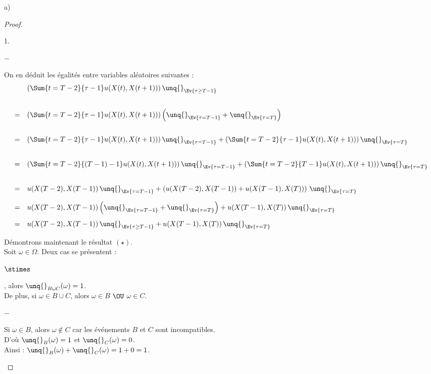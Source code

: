 \documentclass[11pt]{article}%
\begin{document}
\begin{noliste}{a)}
\begin{proof}
\begin{remarkL}{1.}
\begin{noliste}{$-$}
	  \item On en déduit les égalités entre variables aléatoires
	  suivantes :
	  \[
	    \begin{array}{cl}
	      & \left(\Sum{t=T-2}{\tau -1} u(X(t),X(t+1))\right)
	      \unq{}_{\Ev{\tau \geq T-1}}
	      \\[.8cm]
	      =& 
	      \left(\Sum{t=T-2}{\tau -1} u(X(t),X(t+1))\right)
	      \left(\unq{}_{\Ev{\tau = T-1}} + \unq{}_{\Ev{\tau =T}}
	      \right)
	      \\[.8cm]
	      =& 
	      \left(\Sum{t=T-2}{\tau -1} u(X(t),X(t+1))\right)
	      \unq{}_{\Ev{\tau = T-1}} +
	      \left(\Sum{t=T-2}{\tau -1} u(X(t),X(t+1))\right)
	      \unq{}_{\Ev{\tau = T}}
	      \\[.8cm]
	      =& 
	      \left(\Sum{t=T-2}{(T-1) -1} u(X(t),X(t+1))\right)
	      \unq{}_{\Ev{\tau = T-1}} +
	      \left(\Sum{t=T-2}{T -1} u(X(t),X(t+1))\right)
	      \unq{}_{\Ev{\tau = T}}
	      \\[.8cm]
	      =&
	      u(X(T-2),X(T-1)) \, \unq{}_{\Ev{\tau =T-1}} + 
	      \left(u(X(T-2),X(T-1)) + u(X(T-1),X(T))\right)
	      \, \unq{}_{\Ev{\tau =T}}
	      \\[.4cm]
	      =&
	      u(X(T-2),X(T-1)) \left( \unq{}_{\Ev{\tau =T-1}} + 
	      \unq{}_{\Ev{\tau =T}}\right)
	      + u(X(T-1),X(T)) \, \unq{}_{\Ev{\tau=T}}
	      \\[.4cm]
	      =&
	      u(X(T-2),X(T-1)) \, \unq{}_{\Ev{\tau \geq T-1}} + 
	      u(X(T-1),X(T)) \, \unq{}_{\Ev{\tau =T}}
	    \end{array}
	  \]
        \end{noliste}
        \end{remarkL}
        
        
        \newpage
        
        
        \begin{remark}
        Démontrons maintenant le résultat $(\star)$.\\
        Soit $\omega \in \Omega$. Deux cas se présentent :
        \begin{noliste}{$\stimes$}
	  \item {}, alors 
	  $\unq{}_{B \cup C}(\omega)=1$.\\[.1cm]
	  De plus, si $\omega \in B \cup C$, alors $\omega \in B$ $\OU$
	  $\omega \in C$.
	  \begin{liste}{$-$}
	    \item Si $\omega \in B$, alors $\omega \notin C$ car les
	    événements $B$ et $C$ sont incompatibles.\\
	    D'où $\unq{}_B(\omega)=1$ et $\unq{}_C(\omega)=0$.\\
	    Ainsi : $\unq{}_B(\omega) + \unq{}_C(\omega) = 1+0=1$.
	    

\end{liste}
\end{noliste}
\end{remark}
\end{proof}
\end{noliste}
\end{document}
